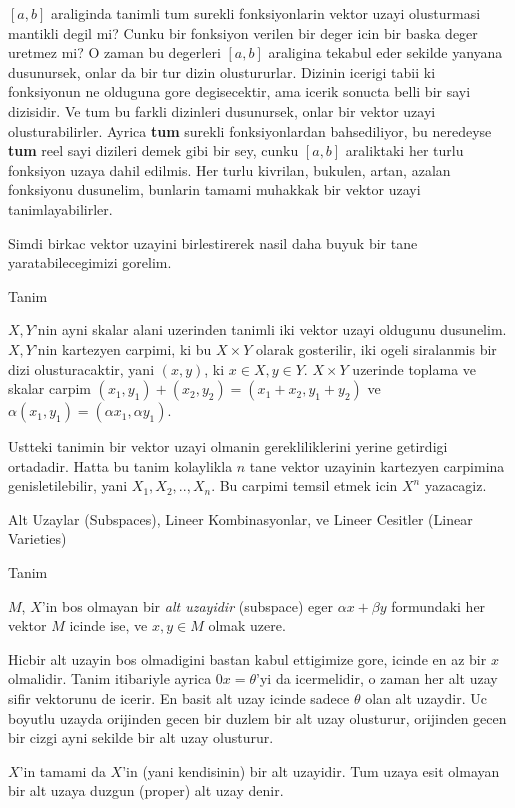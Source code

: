 \documentclass[12pt,fleqn]{article}\usepackage{../common}
\begin{document}
$[a,b]$ araliginda tanimli tum surekli fonksiyonlarin vektor uzayi
olusturmasi mantikli degil mi? Cunku bir fonksiyon verilen bir deger icin
bir baska deger uretmez mi? O zaman bu degerleri $[a,b]$ araligina tekabul
eder sekilde yanyana dusunursek, onlar da bir tur dizin
olustururlar. Dizinin icerigi tabii ki fonksiyonun ne olduguna gore
degisecektir, ama icerik sonucta belli bir sayi dizisidir. Ve tum bu farkli
dizinleri dusunursek, onlar bir vektor uzayi olusturabilirler. Ayrica
\textbf{tum} surekli fonksiyonlardan bahsediliyor, bu neredeyse
\textbf{tum} reel sayi dizileri demek gibi bir sey, cunku $[a,b]$
araliktaki her turlu fonksiyon uzaya dahil edilmis. Her turlu kivrilan,
bukulen, artan, azalan fonksiyonu dusunelim, bunlarin tamami muhakkak bir
vektor uzayi tanimlayabilirler. 

Simdi birkac vektor uzayini birlestirerek nasil daha buyuk bir tane
yaratabilecegimizi gorelim. 

Tanim

$X,Y$'nin ayni skalar alani uzerinden tanimli iki vektor uzayi oldugunu
dusunelim. $X,Y$'nin kartezyen carpimi, ki bu $X \times Y$ olarak
gosterilir, iki ogeli siralanmis bir dizi olusturacaktir, 
yani $(x,y)$, ki $ x \in X, y \in Y$. $X \times Y$ uzerinde toplama ve
skalar carpim $(x_1,y_1) + (x_2,y_2) = (x_1+x_2, y_1+y_2)$ ve
$\alpha(x_1,y_1) = (\alpha x_1,\alpha y_1)$. 

Ustteki tanimin bir vektor uzayi olmanin gerekliliklerini yerine getirdigi
ortadadir. Hatta bu tanim kolaylikla $n$ tane vektor uzayinin kartezyen
carpimina genisletilebilir, yani $X_1,X_2,..,X_n$. Bu carpimi temsil etmek
icin $X^n$ yazacagiz. 

Alt Uzaylar (Subspaces), Lineer Kombinasyonlar, ve Lineer Cesitler (Linear Varieties) 

Tanim 

$M$, $X$'in bos olmayan bir {\em alt uzayidir} (subspace) eger $\alpha x + \beta y$
formundaki her vektor $M$ icinde ise, ve $x,y \in M$ olmak uzere. 

Hicbir alt uzayin bos olmadigini bastan kabul ettigimize gore, icinde en az
bir $x$ olmalidir. Tanim itibariyle ayrica  $0 x = \theta$'yi da
icermelidir, o zaman her alt uzay sifir vektorunu de icerir. En basit alt
uzay icinde sadece $\theta$ olan alt uzaydir. Uc boyutlu uzayda orijinden
gecen bir duzlem bir alt uzay olusturur, orijinden gecen bir cizgi ayni
sekilde bir alt uzay olusturur. 

$X$'in tamami da $X$'in (yani kendisinin) bir alt uzayidir. Tum uzaya esit
olmayan bir alt uzaya duzgun (proper) alt uzay denir. 
\end{document}
